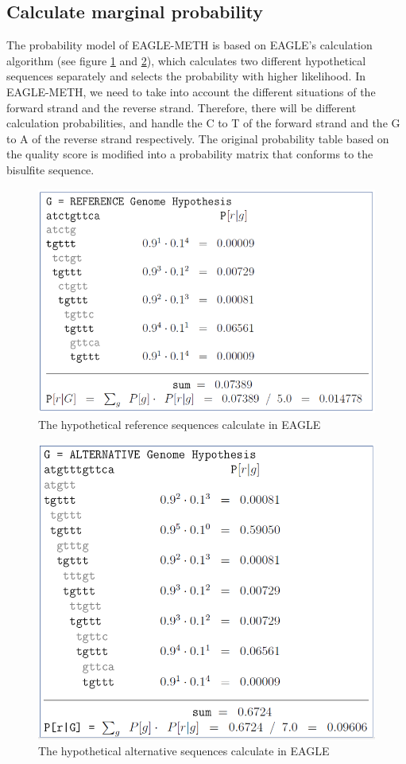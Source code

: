 \documentclass{PHlab-thesis}
\begin{document}
\subsection{Calculate marginal probability}
The probability model of EAGLE-METH is based on EAGLE's calculation algorithm (see figure \ref{fig:ref} and \ref{fig:alt}), which calculates two different hypothetical sequences separately and selects the probability with higher likelihood. In EAGLE-METH, we need to take into account the different situations of the forward strand and the reverse strand. Therefore, there will be different calculation probabilities, and handle the C to T of the forward strand and the G to A of the reverse strand respectively. The original probability table based on the quality score is modified into a probability matrix that conforms to the bisulfite sequence.
\begin{figure}[h]
  \centering
  \includegraphics[scale=0.8]{figures/ref.PNG}
  \caption{The hypothetical reference sequences calculate in EAGLE}
  \label{fig:ref}
\end{figure}
\begin{figure}[h]
  \centering
  \includegraphics[scale=0.6]{figures/alter.PNG}
  \caption{The hypothetical alternative sequences calculate in EAGLE}
  \label{fig:alt}
\end{figure}
\end{document}
